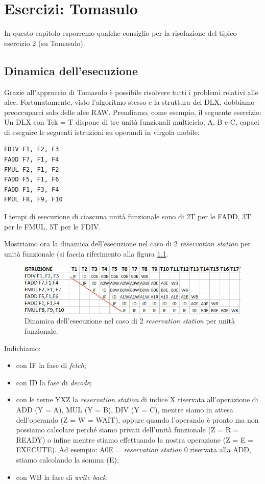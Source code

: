 \chapter{Esercizi: Tomasulo}
\label{sec:tomasulo}

In questo capitolo esporremo qualche consiglio per la risoluzione del tipico esercizio 2 (su Tomasulo).

\section{Dinamica dell'esecuzione}
\label{sec:dinamicaTomasulo}

Grazie all'approccio di Tomasulo è possibile risolvere tutti i problemi relativi alle alee. Fortunatamente, visto l'algoritmo stesso e la struttura del DLX, dobbiamo preoccuparci solo delle alee RAW. 
Prendiamo, come esempio, il seguente esercizio:\\

\textsf{Un DLX con Tck = T dispone di tre unità funzionali multiciclo, A, B e C, capaci di eseguire le seguenti istruzioni su operandi in virgola mobile:}
\begin{verbatim}
FDIV F1, F2, F3
FADD F7, F1, F4
FMUL F2, F1, F2
FADD F5, F1, F6
FADD F1, F3, F4
FMUL F8, F9, F10
\end{verbatim}
\textsf{I tempi di esecuzione di ciascuna unità funzionale sono di 2T per le FADD, 3T per le FMUL, 5T per le FDIV.}

Mostriamo ora la dinamica dell'esecuzione nel caso di 2 \textit{reservation station} per unità funzionale (si faccia riferimento alla figura \ref{fig:tomasEs1}.
\begin{figure}[!h]
\centering
\includegraphics[width=\columnwidth]{img/tomasEs1}
\caption{Dinamica dell'esecuzione nel caso di 2 \textit{reservation station} per unità funzionale.}
\label{fig:tomasEs1}
\end{figure}
Indichiamo:
\begin{itemize}
\item con IF la fase di \textit{fetch};
\item con ID la fase di \textit{decode};
\item con le terne YXZ la \textit{reservation station} di indice X riservata all'operazione di ADD (Y = A), MUL (Y = B), DIV (Y = C), mentre siamo in attesa dell'operando (Z = W = WAIT), oppure quando l'operando è pronto ma non possiamo calcolare perché siamo privati dell'unità funzionale (Z = R = READY) o infine mentre stiamo effettuando la nostra operazione (Z = E = EXECUTE). Ad esempio: A0E = \textit{reservation station} 0 riservata alla ADD, stiamo calcolando la somma (E);
\item con WB la fase di \textit{write back}.
\end{itemize}

